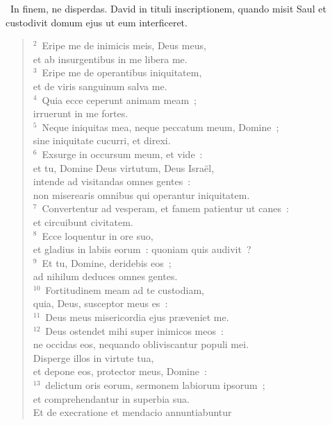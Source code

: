 ~\lettrine[lines=10,image=true,loversize=0.05,lraise=-0.03]{I}{}n finem, ne disperdas. David in tituli inscriptionem, quando misit Saul et custodivit domum ejus ut eum interficeret.
\begin{flushleft}\begin{verse}\vspace{6pt}${}^{2}$~Eripe me de inimicis meis, Deus meus,\\ et ab insurgentibus in me libera me.\\
${}^{3}$~Eripe me de operantibus iniquitatem,\\ et de viris sanguinum salva me.\\
${}^{4}$~Quia ecce ceperunt animam meam~;\\ irruerunt in me fortes.\\
${}^{5}$~Neque iniquitas mea, neque peccatum meum, Domine~;\\ sine iniquitate cucurri, et direxi.\\
${}^{6}$~Exsurge in occursum meum, et vide~:\\ et tu, Domine Deus virtutum, Deus Isra\"el,\\ intende ad visitandas omnes gentes~:\\ non miserearis omnibus qui operantur iniquitatem.\\
${}^{7}$~Convertentur ad vesperam, et famem patientur ut canes~:\\ et circuibunt civitatem.\\
${}^{8}$~Ecce loquentur in ore suo,\\ et gladius in labiis eorum~: quoniam quis audivit~?\\
${}^{9}$~Et tu, Domine, deridebis eos~;\\ ad nihilum deduces omnes gentes.\\
${}^{10}$~Fortitudinem meam ad te custodiam,\\ quia, Deus, susceptor meus es~:\\
${}^{11}$~Deus meus misericordia ejus pr\ae veniet me.\\
${}^{12}$~Deus ostendet mihi super inimicos meos~:\\ ne occidas eos, nequando obliviscantur populi mei.\\ Disperge illos in virtute tua,\\ et depone eos, protector meus, Domine~:\\
${}^{13}$~delictum oris eorum, sermonem labiorum ipsorum~;\\ et comprehendantur in superbia sua.\\ Et de execratione et mendacio annuntiabuntur

\end{verse}
\end{flushleft}
